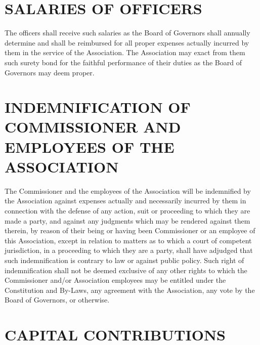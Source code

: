 \documentclass[]{book}
\theoremstyle{definition}
\theoremstyle{definition}
\theoremstyle{definition}
\theoremstyle{remark}
\begin{document}
\section{SALARIES OF OFFICERS}\label{salaries-of-officers}

The officers shall receive such salaries as the Board of Governors shall
annually determine and shall be reimbursed for all proper expenses
actually incurred by them in the service of the Association. The
Association may exact from them such surety bond for the faithful
performance of their duties as the Board of Governors may deem proper.

\section{INDEMNIFICATION OF COMMISSIONER AND EMPLOYEES OF THE
ASSOCIATION}\label{indemnification-of-commissioner-and-employees-of-the-association}

The Commissioner and the employees of the Association will be
indemnified by the Association against expenses actually and necessarily
incurred by them in connection with the defense of any action, suit or
proceeding to which they are made a party, and against any judgments
which may be rendered against them therein, by reason of their being or
having been Commissioner or an employee of this Association, except in
relation to matters as to which a court of competent jurisdiction, in a
proceeding to which they are a party, shall have adjudged that such
indemnification is contrary to law or against public policy. Such right
of indemnification shall not be deemed exclusive of any other rights to
which the Commissioner and/or Association employees may be entitled
under the Constitution and By-Laws, any agreement with the Association,
any vote by the Board of Governors, or otherwise.

\section{CAPITAL CONTRIBUTIONS}\label{capital-contributions}
\end{document}
